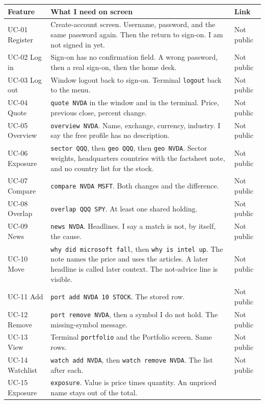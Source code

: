 \documentclass[11pt]{article}
\begin{document}
\begin{center}
\small
\begin{tabularx}{\textwidth}{@{}p{1.6cm}Xp{2.4cm}@{}}
\toprule
Feature & What I need on screen & Link \\
\midrule
UC-01 Register &
Create-account screen. Username, password, and the same password again. Then the return to sign-on. I am not signed in yet. &
Not public \\
UC-02 Log in &
Sign-on has no confirmation field. A wrong password, then a real sign-on, then the home desk. &
Not public \\
UC-03 Log out &
Window logout back to sign-on. Terminal \texttt{logout} back to the menu. &
Not public \\
UC-04 Quote &
\texttt{quote NVDA} in the window and in the terminal. Price, previous close, percent change. &
Not public \\
UC-05 Overview &
\texttt{overview NVDA}. Name, exchange, currency, industry. I say the free profile has no description. &
Not public \\
UC-06 Exposure &
\texttt{sector QQQ}, then \texttt{geo QQQ}, then \texttt{geo NVDA}. Sector weights, headquarters countries with the factsheet note, and no country list for the stock. &
Not public \\
UC-07 Compare &
\texttt{compare NVDA MSFT}. Both changes and the difference. &
Not public \\
UC-08 Overlap &
\texttt{overlap QQQ SPY}. At least one shared holding. &
Not public \\
UC-09 News &
\texttt{news NVDA}. Headlines. I say a match is not, by itself, the cause. &
Not public \\
UC-10 Move &
\texttt{why did microsoft fall}, then \texttt{why is intel up}. The note names the price and uses the articles. A later headline is called later context. The not-advice line is visible. &
Not public \\
UC-11 Add &
\texttt{port add NVDA 10 STOCK}. The stored row. &
Not public \\
UC-12 Remove &
\texttt{port remove NVDA}, then a symbol I do not hold. The missing-symbol message. &
Not public \\
UC-13 View &
Terminal \texttt{portfolio} and the Portfolio screen. Same rows. &
Not public \\
UC-14 Watchlist &
\texttt{watch add NVDA}, then \texttt{watch remove NVDA}. The list after each. &
Not public \\
UC-15 Exposure &
\texttt{exposure}. Value is price times quantity. An unpriced name stays out of the total. &

\end{tabularx}
\end{center}
\end{document}
